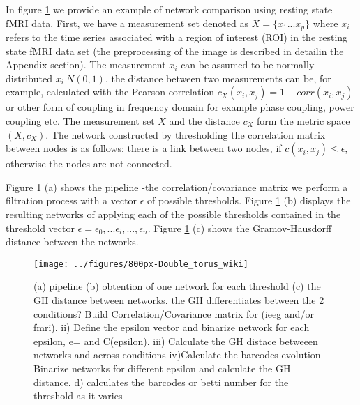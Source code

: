\documentclass[onecollarge,runningheads]{svjour2}
\begin{document}
In figure \ref{fig:ph1} we provide an example of network comparison using resting state fMRI data.
First, we have a measurement set denoted as $X= \{x_1 ... x_p\}$ where $x_i$ refers to the time series associated with a region of interest (ROI) in the resting state fMRI data set (the preprocessing of the image is described in detailin the Appendix section).
The measurement $x_i$ can be assumed to be normally distributed $x_i ~ N(0,1)$, the distance between two measurements can be, for example, calculated with the Pearson correlation $c_{X}(x_i,x_j)= 1 - corr(x_i,x_j)$ or other form of coupling in frequency domain for example phase coupling, power coupling etc.
The measurement set $X$ and the distance $c_X$ form the metric space $(X,c_X)$. The network constructed by thresholding the correlation matrix between nodes is as follows: there is a link between two nodes, if $c(x_i,x_j) \leq \epsilon$, otherwise the nodes are not connected.

Figure \ref{fig:ph1} (a) shows the pipeline -the correlation/covariance matrix we perform a filtration process with a vector $\epsilon$ of possible thresholds.
Figure \ref{fig:ph1} (b) displays the resulting networks of applying each of the possible thresholds contained in the threshold vector $\epsilon= \epsilon_0,... \epsilon_i, ..., \epsilon_n$. Figure \ref{fig:ph1} (c) shows the Gramov-Hausdorff distance between the networks.


\begin{figure}[h]
        \centering
        \texttt{[image: ../figures/800px-Double\_torus\_wiki]}
        \caption{(a) pipeline (b) obtention of one network for each threshold (c) the GH distance between networks. the GH differentiates between the 2 conditions? Build Correlation/Covariance matrix for (ieeg and/or fmri). ii) Define the epsilon vector and binarize network for each epsilon, e={} and C(epsilon). iii) Calculate the GH distace betweeen networks and across conditions iv)Calculate the barcodes evolution
        Binarize networks for different epsilon and calculate the GH distance. d) calculates the barcodes or betti number for the threshold as it varies
}
\label{fig:ph1}
\end{figure}
\end{document}
